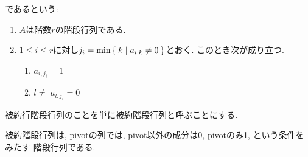\begin{definition}
  であるという:
  \begin{enumerate}
  \item $A$は階数$r$の階段行列である.
  \item $1\leq i \leq r$に対し$j_i = \min\Set{k|a_{i,k}\neq 0}$とおく.
    このとき次が成り立つ.
    \begin{enumerate}
      \item $a_{i,j_i}=1$
      \item $l\neq $ $a_{l,j_i}=0$
    \end{enumerate}
  \end{enumerate}
  被約行階段行列のことを単に被約階段行列と呼ぶことにする.
\end{definition}
被約階段行列は,
pivotの列では, pivot以外の成分は0, pivotのみ1, という条件をみたす
階段行列である.

